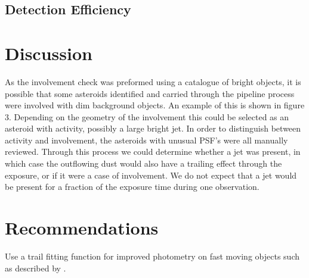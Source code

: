 \documentclass[iop,apj]{emulateapj}
\begin{document}
\subsection{Detection Efficiency}


\section{Discussion}

As the involvement check was preformed using a catalogue of bright objects, it is possible that some asteroids identified and carried through the pipeline process were involved with dim background objects. An example of this is shown in figure 3. Depending on the geometry of the involvement this could be selected as an asteroid with activity, possibly a large bright jet. In order to distinguish between activity and involvement, the asteroids with unusual PSF's were all manually reviewed. Through this process we could determine whether a jet was present, in which case the outflowing dust would also have a trailing effect through the exposure, or if it were a case of involvement. We do not expect that a jet would be present for a fraction of the exposure time during one observation. 

\section{Recommendations }

Use a trail fitting function for improved photometry on fast moving objects such as described by \cite{veres12}.




\end{document}
